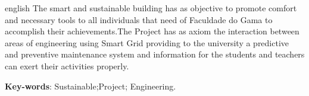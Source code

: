 \begin{resumo}[Abstract]
 \begin{otherlanguage*}{english}
 The smart and sustainable building has as objective to promote comfort and necessary tools to all individuals that need of Faculdade do Gama to accomplish their achievements.The Project has as axiom the interaction between areas of engineering using Smart Grid providing to the university a predictive and preventive maintenance system and information for the students and teachers can exert their activities properly. 

   \vspace{\onelineskip}
 
   \noindent 
   \textbf{Key-words}: Sustainable;Project; Engineering. 
 \end{otherlanguage*}
\end{resumo}
